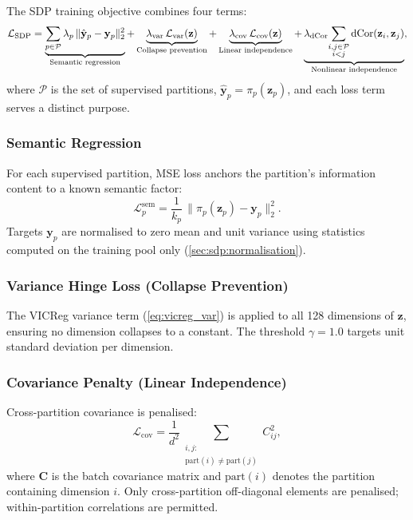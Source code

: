The SDP training objective combines four terms:
\begin{equation}
  \mathcal{L}_{\text{SDP}} =
    \underbrace{\sum_{p \in \mathcal{P}} \lambda_p\,
      \|\hat{\mathbf{y}}_p - \mathbf{y}_p\|_2^2
    }_{\text{Semantic regression}}
  + \underbrace{\lambda_{\text{var}}\,
      \mathcal{L}_{\text{var}}(\mathbf{z})
    }_{\text{Collapse prevention}}
  + \underbrace{\lambda_{\text{cov}}\,
      \mathcal{L}_{\text{cov}}(\mathbf{z})
    }_{\text{Linear independence}}
  + \underbrace{\lambda_{\text{dCor}}\!
      \sum_{\substack{i,j \in \mathcal{P} \\ i < j}}
      \operatorname{dCor}(\mathbf{z}_i, \mathbf{z}_j)
    }_{\text{Nonlinear independence}},
  \label{eq:sdp_loss}
\end{equation}
where $\mathcal{P}$ is the set of supervised partitions,
$\hat{\mathbf{y}}_p = \pi_p(\mathbf{z}_p)$, and each loss term serves a
distinct purpose.

\subsubsection{Semantic Regression}

For each supervised partition, MSE loss anchors the partition's information
content to a known semantic factor:
\begin{equation}
  \mathcal{L}_p^{\text{sem}} = \frac{1}{k_p}\,
    \|\pi_p(\mathbf{z}_p) - \mathbf{y}_p\|_2^2.
  \label{eq:sem_loss}
\end{equation}
Targets $\mathbf{y}_p$ are normalised to zero mean and unit variance using
statistics computed on the training pool only (\cref{sec:sdp:normalisation}).

\subsubsection{Variance Hinge Loss (Collapse Prevention)}

The VICReg variance term (\cref{eq:vicreg_var}) is applied to all 128
dimensions of $\mathbf{z}$, ensuring no dimension collapses to a constant.
The threshold $\gamma = 1.0$ targets unit standard deviation per dimension.

\subsubsection{Covariance Penalty (Linear Independence)}

Cross-partition covariance is penalised:
\begin{equation}
  \mathcal{L}_{\text{cov}} = \frac{1}{d^2}
    \sum_{\substack{i,j: \\ \text{part}(i) \neq \text{part}(j)}} C_{ij}^2,
  \label{eq:cov_loss}
\end{equation}
where $\mathbf{C}$ is the batch covariance matrix and $\text{part}(i)$
denotes the partition containing dimension $i$. Only cross-partition
off-diagonal elements are penalised; within-partition correlations are
permitted.

